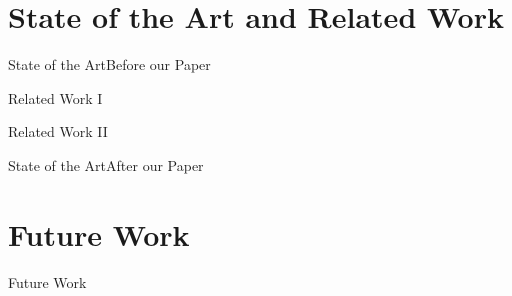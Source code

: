 \section{State of the Art and Related Work}
\begin{frame}{State of the Art}{Before our Paper}
\end{frame}

\begin{frame}{Related Work I}{}
\end{frame}

\begin{frame}{Related Work II}{}
\end{frame}

\begin{frame}{State of the Art}{After our Paper}
\end{frame}

\section{Future Work}
\begin{frame}{Future Work}{}
\end{frame}
